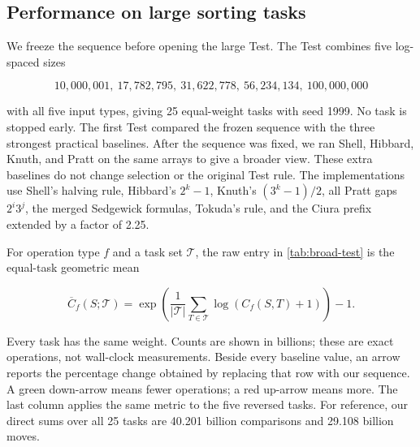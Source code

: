 \subsection{Performance on large sorting tasks}

We freeze the sequence before opening the large Test.  The Test combines five
log-spaced sizes

\[
  10{,}000{,}001,\ 17{,}782{,}795,\ 31{,}622{,}778,\
  56{,}234{,}134,\ 100{,}000{,}000
\]

with all five input types, giving 25 equal-weight tasks with seed 1999.  No
task is stopped early.  The first Test compared the frozen sequence with the
three strongest practical baselines.  After the sequence was fixed, we ran
Shell, Hibbard, Knuth, and Pratt on the same arrays to give a broader view.
These extra baselines do not change selection or the original Test rule.
The implementations use Shell's halving rule, Hibbard's $2^k-1$, Knuth's
$(3^k-1)/2$, all Pratt gaps $2^i3^j$, the merged Sedgewick formulas, Tokuda's
rule, and the Ciura prefix extended by a factor of 2.25.

For operation type $f$ and a task set $\mathcal T$, the raw entry in
\cref{tab:broad-test} is the equal-task geometric mean

\begin{equation}
  \overline C_f(S;\mathcal T)
  =\exp\!\left(
     \frac1{|\mathcal T|}\sum_{T\in\mathcal T}
       \log(C_f(S,T)+1)
    \right)-1.
  \label{eq:test-metric}
\end{equation}

Every task has the same weight.  Counts are shown in billions; these are exact
operations, not wall-clock measurements.  Beside every baseline value, an
arrow reports the percentage change obtained by replacing that row with our
sequence.  A green down-arrow means fewer operations; a red up-arrow means
more.  The last column applies the same metric to the five reversed tasks.
For reference, our direct sums over all 25 tasks are 40.201 billion comparisons
and 29.108 billion moves.


